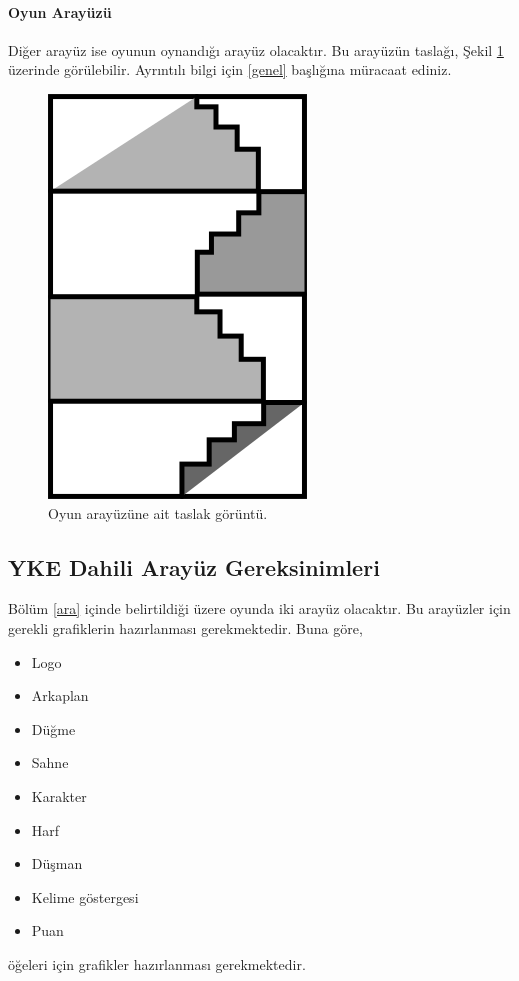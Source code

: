 \documentclass[12pt,a4paper]{article}
\begin{document}
   \paragraph{Oyun Arayüzü}
   Diğer arayüz ise oyunun oynandığı arayüz olacaktır. Bu arayüzün taslağı, Şekil \ref{fig:gp} üzerinde görülebilir. Ayrıntılı bilgi için \ref{genel} başlığına müracaat ediniz.
   \begin{figure}[h!]
      \begin{center}
         \includegraphics{res/gp.png}
         \caption{Oyun arayüzüne ait taslak görüntü.}
         \label{fig:gp}
      \end{center}
   \end{figure}

   \subsection{YKE Dahili Arayüz Gereksinimleri}
   Bölüm \ref{ara} içinde belirtildiği üzere oyunda iki arayüz olacaktır. Bu arayüzler için gerekli grafiklerin hazırlanması gerekmektedir. Buna göre,
   \begin{itemize}
      \item Logo
      \item Arkaplan
      \item Düğme
      \item Sahne
      \item Karakter
      \item Harf
      \item Düşman
      \item Kelime göstergesi
      \item Puan
   \end{itemize}
   öğeleri için grafikler hazırlanması gerekmektedir.
\end{document}
